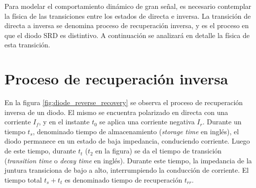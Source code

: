 Para modelar el comportamiento dinámico de gran señal, es necesario contemplar
la física de las transiciones entre los estados de directa e inversa. La
transición de directa a inversa se denomina proceso de recuperación inversa, y
es el proceso en que el diodo SRD es distintivo. A continuación se analizará en
detalle la física de esta transición.

\section{Proceso de recuperación inversa}

En la figura \ref{fig:diode_reverse_recovery} se observa el proceso de
recuperación inversa de un diodo. El mismo se encuentra polarizado en directa
con una corriente $I_f$, y en el instante $t_0$ se aplica una corriente negativa
$I_r$. Durante un tiempo $t_s$, denominado tiempo de almacenamiento
(\textit{storage time} en inglés), el diodo permanece en un estado de baja
impedancia, conduciendo corriente. Luego de este tiempo, durante $t_t$ ($t_2$ en
la figura) se da el tiempo de transición (\textit{transition time} o
\textit{decay time} en inglés).  Durante este tiempo, la impedancia de la
juntura transiciona de bajo a alto, interrumpiendo la conducción de corriente.
El tiempo total $t_s+t_t$ es denominado tiempo de recuperación $t_{rr}$.

